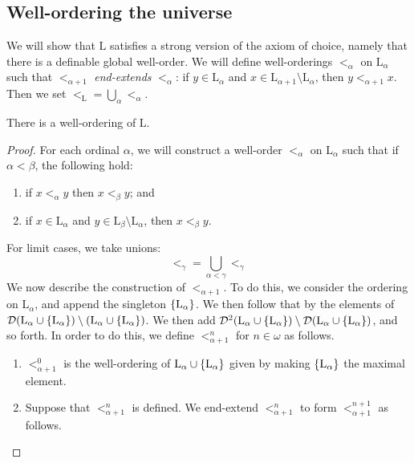 \subsection{Well-ordering the universe}
We will show that \( \mathrm{L} \) satisfies a strong version of the axiom of choice, namely that there is a definable global well-order.
We will define well-orderings \( <_\alpha \) on \( \mathrm{L}_\alpha \) such that \( <_{\alpha + 1} \) \emph{end-extends} \( <_\alpha \): if \( y \in \mathrm{L}_\alpha \) and \( x \in \mathrm{L}_{\alpha + 1} \setminus \mathrm{L}_\alpha \), then \( y <_{\alpha + 1} x \).
Then we set \( <_{\mathrm{L}} = \bigcup_\alpha <_\alpha \).
\begin{theorem}
    There is a well-ordering of \( \mathrm{L} \).
\end{theorem}
\begin{proof}
    For each ordinal \( \alpha \), we will construct a well-order \( <_\alpha \) on \( \mathrm{L}_\alpha \) such that if \( \alpha < \beta \), the following hold:
    \begin{enumerate}
        \item if \( x <_\alpha y \) then \( x <_\beta y \); and
        \item if \( x \in \mathrm{L}_\alpha \) and \( y \in \mathrm{L}_\beta \setminus \mathrm{L}_\alpha \), then \( x <_\beta y \).
    \end{enumerate}
    For limit cases, we take unions:
    \[ {<_\gamma} = \bigcup_{\alpha < \gamma} <_\gamma \]
    We now describe the construction of \( <_{\alpha + 1} \).
    To do this, we consider the ordering on \( \mathrm{L}_\alpha \), and append the singleton \( \qty{\mathrm{L}_\alpha} \).
    We then follow that by the elements of \( \mathcal D(\mathrm{L}_\alpha \cup \qty{\mathrm{L}_\alpha}) \setminus (\mathrm{L}_\alpha \cup \qty{\mathrm{L}_\alpha}) \).
    We then add \( \mathcal D^2(\mathrm{L}_\alpha \cup \qty{\mathrm{L}_\alpha}) \setminus \mathcal D(\mathrm{L}_\alpha \cup \qty{\mathrm{L}_\alpha}) \), and so forth.
    In order to do this, we define \( <_{\alpha + 1}^n \) for \( n \in \omega \) as follows.
    \begin{enumerate}
        \item \( <_{\alpha + 1}^0 \) is the well-ordering of \( \mathrm{L}_\alpha \cup \qty{\mathrm{L}_\alpha} \) given by making \( \qty{\mathrm{L}_\alpha} \) the maximal element.
        \item Suppose that \( <_{\alpha + 1}^n \) is defined.
        We end-extend \( <_{\alpha + 1}^n \) to form \( <_{\alpha + 1}^{n + 1} \) as follows.

\end{enumerate}
\end{proof}
